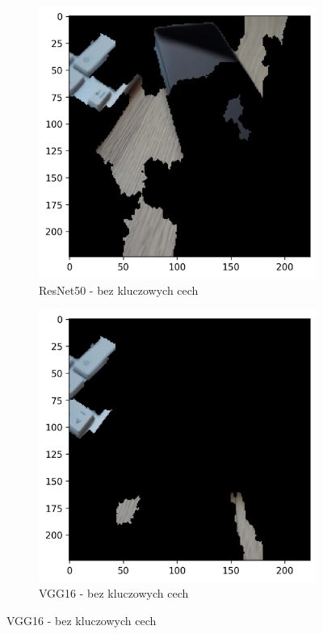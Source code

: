 \documentclass[12pt,a4paper]{article}
\begin{document}
\begin{figure}[H]
  \centering
  \begin{subfigure}{0.45\textwidth}
    \centering
    \includegraphics[width=\textwidth]{../out/ResNet50-hidden.png}
    \caption{ResNet50 - bez kluczowych cech}
  \end{subfigure}
  \begin{subfigure}{0.45\textwidth}
    \centering
    \includegraphics[width=\textwidth]{../out/VGG16-hidden.png}
    \caption{VGG16 - bez kluczowych cech}
  \end{subfigure}
\end{figure}
\end{document}
